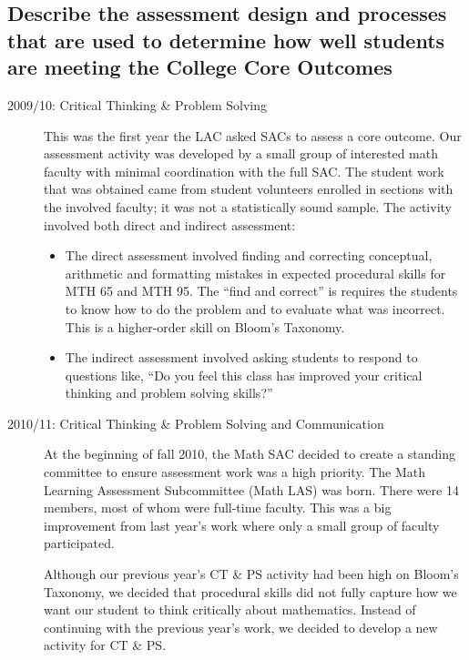 \subsection{Describe the assessment design and processes that are used to determine how well students are meeting the College Core Outcomes}

\begin{description}
\item [2009/10: Critical Thinking  \& Problem Solving]

This was the first year the LAC asked SACs to assess a core outcome. Our assessment activity was developed by a small group of interested math faculty with minimal coordination with the full SAC. The student work that was obtained came from student volunteers enrolled in sections with the involved faculty; it was not a statistically sound sample.  The activity involved both direct and indirect assessment: 
\begin{itemize}
\item The direct assessment involved finding and correcting conceptual, arithmetic and formatting mistakes in expected procedural skills for MTH 65 and MTH 95.  The ``find and correct'' is requires the students to know how to do the problem and to evaluate what was incorrect.  This is a higher-order skill on Bloom's Taxonomy. 

\item The indirect assessment involved asking students to respond to questions like, ``Do you feel this class has improved your critical thinking and problem solving skills?''
\end{itemize}

\item[2010/11:  Critical Thinking \& Problem Solving and Communication]

At the beginning of fall 2010, the Math SAC decided to create a standing committee to ensure assessment work was a high priority. The Math Learning Assessment Subcommittee (Math LAS) was born.  There were 14 members, most of whom were full-time faculty. This was a big improvement from last year's work where only a small group of faculty participated.

Although our previous year's CT \& PS activity had been high on Bloom's Taxonomy, we decided that procedural skills did not fully capture how we want our student to think critically about mathematics.  Instead of continuing with the previous year's work, we decided to develop a new activity for CT \& PS. 


\end{description}
